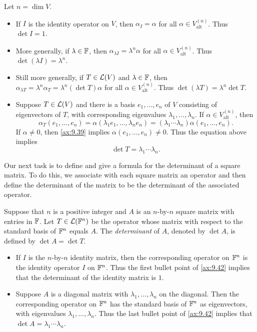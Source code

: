 \begin{example}\label{ax:9.42}
Let $n=\dim V$.
\begin{itemize}
\item If $I$ is the identity operator on $V$, then $\alpha_I=\alpha$ for all
  $\alpha\in V_{\mathrm{alt}}^{(n)}$. Thus $\det I=1$.
\item More generally, if $\lambda\in\mathbb{F}$, then $\alpha_{\lambda I}=\lambda^n\alpha$
  for all $\alpha\in V_{\mathrm{alt}}^{(n)}$. Thus $\det(\lambda I)=\lambda^n$.
\item Still more generally, if $T\in\mathcal{L}(V)$ and $\lambda\in\mathbb{F}$, then
  $\alpha_{\lambda T}=\lambda^n\alpha_T=\lambda^n(\det T)\alpha$ for all
  $\alpha\in V_{\mathrm{alt}}^{(n)}$. Thus $\det(\lambda T)=\lambda^n\det T$.
\item Suppose $T\in\mathcal{L}(V)$ and there is a basis $e_1,\dots,e_n$ of $V$
  consisting of eigenvectors of $T$, with corresponding eigenvalues
  $\lambda_1,\dots,\lambda_n$. If $\alpha\in V_{\mathrm{alt}}^{(n)}$, then
  \[ \alpha_T(e_1,\dots,e_n) = \alpha(\lambda_1e_1,\dots,\lambda_ne_n)
     = (\lambda_1\cdots\lambda_n)\alpha(e_1,\dots,e_n). \]
  If $\alpha\ne0$, then \ref{ax:9.39} implies $\alpha(e_1,\dots,e_n)\ne0$.
  Thus the equation above implies
  \[ \det T = \lambda_1\cdots\lambda_n. \]
\end{itemize}
\end{example}

Our next task is to define and give a formula for the determinant of a square
matrix. To do this, we associate with each square matrix an operator and then
define the determinant of the matrix to be the determinant of the associated
operator.

\begin{definition}\label{ax:9.43}
Suppose that $n$ is a positive integer and $A$ is an $n$-by-$n$ square matrix
with entries in $\mathbb{F}$. Let $T\in\mathcal{L}(\mathbb{F}^n)$ be the operator whose matrix with
respect to the standard basis of $\mathbb{F}^n$ equals $A$. The \emph{determinant} of
$A$, denoted by $\det A$, is defined by $\det A=\det T$.
\end{definition}

\begin{example}\label{ax:9.44}\leavevmode
\begin{itemize}
\item If $I$ is the $n$-by-$n$ identity matrix, then the corresponding operator
  on $\mathbb{F}^n$ is the identity operator $I$ on $\mathbb{F}^n$. Thus the first bullet point
  of \ref{ax:9.42} implies that the determinant of the identity matrix is $1$.
\item Suppose $A$ is a diagonal matrix with $\lambda_1,\dots,\lambda_n$ on the
  diagonal. Then the corresponding operator on $\mathbb{F}^n$ has the standard basis
  of $\mathbb{F}^n$ as eigenvectors, with eigenvalues $\lambda_1,\dots,\lambda_n$. Thus
  the last bullet point of \ref{ax:9.42} implies that
  $\det A=\lambda_1\cdots\lambda_n$.
\end{itemize}
\end{example}

